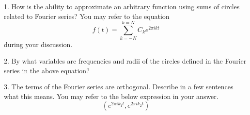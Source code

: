 1. How is the ability to approximate an arbitrary function using sums of circles related to Fourier series? You may refer to the equation
\begin{equation}
    f(t) = \sum_{k=-N}^{k=N} C_k e^{2 \pi i k t}
\end{equation}
during your discussion.

2. By what variables are frequencies and radii of the circles defined in the Fourier series in the above equation?

3. The terms of the Fourier series are orthogonal. Describe in a few sentences what this means. You may refer to the below expression in your answer.
\begin{equation}
    (e^{2 \pi i k_1 t},e^{2 \pi i k_2 t})
\end{equation}
